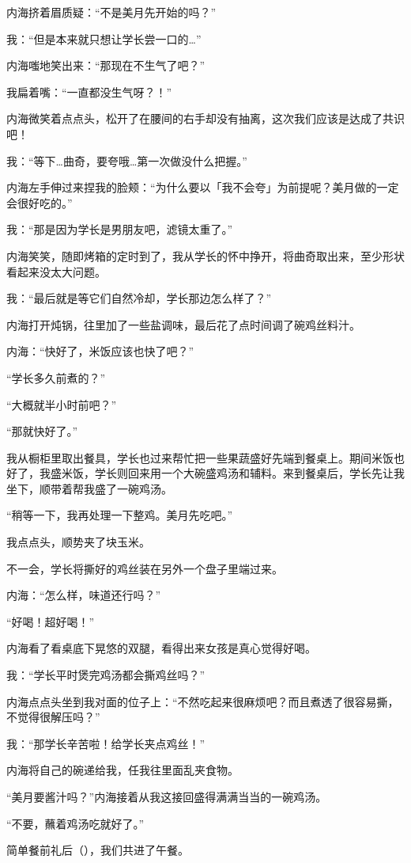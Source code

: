 内海挤着眉质疑：“不是美月先开始的吗？”

我：“但是本来就只想让学长尝一口的…”

内海嗤地笑出来：“那现在不生气了吧？”

我扁着嘴：“一直都没生气呀？！”

内海微笑着点点头，松开了在腰间的右手却没有抽离，这次我们应该是达成了共识吧！

我：“等下…曲奇，要夸哦…第一次做没什么把握。”

内海左手伸过来捏我的脸颊：“为什么要以「我不会夸」为前提呢？美月做的一定会很好吃的。”

我：“那是因为学长是男朋友吧，滤镜太重了。”

内海笑笑，随即烤箱的定时到了，我从学长的怀中挣开，将曲奇取出来，至少形状看起来没太大问题。

我：“最后就是等它们自然冷却，学长那边怎么样了？”

内海打开炖锅，往里加了一些盐调味，最后花了点时间调了碗鸡丝料汁。

内海：“快好了，米饭应该也快了吧？”

“学长多久前煮的？”

“大概就半小时前吧？”

“那就快好了。”

我从橱柜里取出餐具，学长也过来帮忙把一些果蔬盛好先端到餐桌上。期间米饭也好了，我盛米饭，学长则回来用一个大碗盛鸡汤和辅料。来到餐桌后，学长先让我坐下，顺带着帮我盛了一碗鸡汤。

“稍等一下，我再处理一下整鸡。美月先吃吧。”

我点点头，顺势夹了块玉米。

不一会，学长将撕好的鸡丝装在另外一个盘子里端过来。

内海：“怎么样，味道还行吗？”

“好喝！超好喝！”

内海看了看桌底下晃悠的双腿，看得出来女孩是真心觉得好喝。

我：“学长平时煲完鸡汤都会撕鸡丝吗？”

内海点点头坐到我对面的位子上：“不然吃起来很麻烦吧？而且煮透了很容易撕，不觉得很解压吗？”

我：“那学长辛苦啦！给学长夹点鸡丝！”

内海将自己的碗递给我，任我往里面乱夹食物。

“美月要酱汁吗？”内海接着从我这接回盛得满满当当的一碗鸡汤。

“不要，蘸着鸡汤吃就好了。”

简单餐前礼后（），我们共进了午餐。

